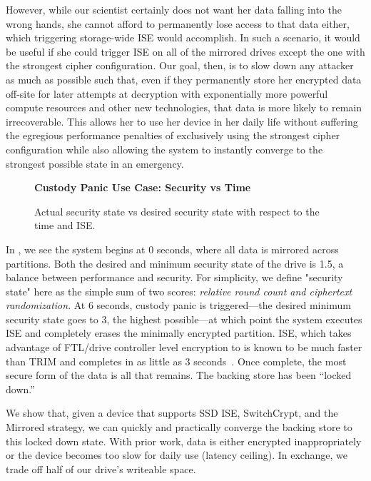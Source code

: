 However, while our scientist certainly does not want her data falling into the
wrong hands, she cannot afford to permanently lose access to that data either,
which triggering storage-wide ISE would accomplish. In such a scenario, it would
be useful if she could trigger ISE on all of the mirrored drives except the one
with the strongest cipher configuration. Our goal, then, is to slow down any
attacker as much as possible such that, even if they permanently store her
encrypted data off-site for later attempts at decryption with exponentially more
powerful compute resources and other new technologies, that data is more likely
to remain irrecoverable. This allows her to use her device in her daily life
without suffering the egregious performance penalties of exclusively using the
strongest cipher configuration while also allowing the system to instantly
converge to the strongest possible state in an emergency.

\begin{figure}[ht] \textbf{Custody Panic Use Case: Security vs Time}\par\medskip
   \centering
   {} \caption{Actual security state vs desired
   security state with respect to the time and ISE.}
  \label{fig:usecase-custody}
\end{figure}

In , we see the system begins at 0 seconds, where
all data is mirrored across partitions. Both the desired and minimum security
state of the drive is 1.5, a balance between performance and security. For
simplicity, we define "security state" here as the simple sum of two scores:
\emph{relative round count and ciphertext randomization}. At 6 seconds, custody
panic is triggered---the desired minimum security state goes to 3, the highest
possible---at which point the system executes ISE and completely erases the
minimally encrypted partition. ISE, which takes advantage of FTL/drive
controller level encryption to  is known to be much faster than TRIM and
completes in as little as 3 seconds~\cite{ISE1,ISE2,ISE3}. Once complete, the
most secure form of the data is all that remains. The backing store has been
``locked down.''

We show that, given a device that supports SSD ISE, SwitchCrypt, and the
Mirrored strategy, we can quickly and practically converge the backing store to
this locked down state. With prior work, data is either encrypted
inappropriately or the device becomes too slow for daily use (latency ceiling).
In exchange, we trade off half of our drive's writeable space.
